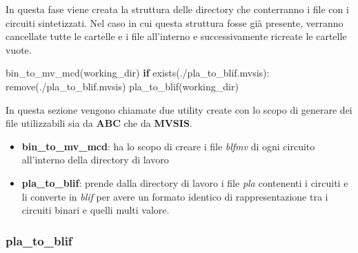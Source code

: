 \documentclass[
  italian,
]{book}
\newenvironment{Shaded}{\begin{snugshade}}{\end{snugshade}}
\newcommand{\ControlFlowTok}[1]{\textcolor[rgb]{0.13,0.29,0.53}{\textbf{#1}}}
\newcommand{\NormalTok}[1]{#1}
\newcommand{\StringTok}[1]{\textcolor[rgb]{0.31,0.60,0.02}{#1}}
\providecommand{\tightlist}{%
  \setlength{\itemsep}{0pt}\setlength{\parskip}{0pt}}
\begin{document}
In questa fase viene creata la struttura delle directory che conterranno i file con i circuiti sintetizzati. Nel caso in cui questa struttura fosse già presente, verranno cancellate tutte le cartelle e i file all'interno e successivamente ricreate le cartelle vuote.

\begin{Shaded}
\begin{Highlighting}[]
\NormalTok{bin\_to\_mv\_mcd(working\_dir)}
\ControlFlowTok{if}\NormalTok{ exists(}\StringTok{\textquotesingle{}./pla\_to\_blif.mvsis\textquotesingle{}}\NormalTok{):}
\NormalTok{  remove(}\StringTok{\textquotesingle{}./pla\_to\_blif.mvsis\textquotesingle{}}\NormalTok{)}
\NormalTok{pla\_to\_blif(working\_dir)}
\end{Highlighting}
\end{Shaded}

\newpage

In questa sezione vengono chiamate due utility create con lo scopo di generare dei file utilizzabili sia da \textbf{ABC} che da \textbf{MVSIS}.

\begin{itemize}
\tightlist
\item
  \textbf{bin\_to\_mv\_mcd}: ha lo scopo di creare i file \emph{blfmv} di ogni circuito all'interno della directory di lavoro
\item
  \textbf{pla\_to\_blif}: prende dalla directory di lavoro i file \emph{pla} contenenti i circuiti e li converte in \emph{blif} per avere un formato identico di rappresentazione tra i circuiti binari e quelli multi valore.
\end{itemize}

\newpage

\hypertarget{pla_to_blif}{%
\subsubsection{pla\_to\_blif}\label{pla_to_blif}}
\end{document}

